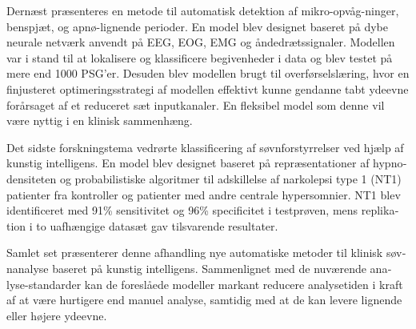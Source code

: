 \begin{otherlanguage}{danish}
Dernæst præsenteres en metode til automatisk detektion af mikro-opvåg-ninger, benspjæt, og apnø-lignende perioder.
En model blev designet baseret på dybe neurale netværk anvendt på EEG, EOG, EMG og åndedrætssignaler.
Modellen var i stand til at lokalisere og klassificere begivenheder i data og blev testet på mere end 1000 PSG'er.
Desuden blev modellen brugt til overførselslæring, hvor en finjusteret optimeringsstrategi af modellen effektivt kunne gendanne tabt ydeevne forårsaget af et reduceret sæt inputkanaler.
En fleksibel model som denne vil være nyttig i en klinisk sammenhæng.

Det sidste forskningstema vedrørte klassificering af søvnforstyrrelser ved hjælp af kunstig intelligens.
En model blev designet baseret på repræsentationer af hypnodensiteten og probabilistiske algoritmer til adskillelse af narkolepsi type 1 (NT1) patienter fra kontroller og patienter med andre centrale hypersomnier.
NT1 blev identificeret med 91\% sensitivitet og 96\% specificitet i testprøven, mens replikation i to uafhængige datasæt gav tilsvarende resultater.

Samlet set præsenterer denne afhandling nye automatiske metoder til klinisk søvnanalyse baseret på kunstig intelligens.
Sammenlignet med de nuværende analyse-standarder kan de foreslåede modeller markant reducere analysetiden i kraft af at være hurtigere end manuel analyse, samtidig med at de kan levere lignende eller højere ydeevne.

\end{otherlanguage}
\endgroup
